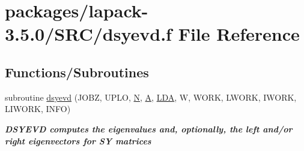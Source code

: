 \hypertarget{dsyevd_8f}{}\section{packages/lapack-\/3.5.0/\+S\+R\+C/dsyevd.f File Reference}
\label{dsyevd_8f}
\subsection*{Functions/\+Subroutines}
\begin{DoxyCompactItemize}
\item 
subroutine \hyperlink{group__doubleSYeigen_ga77dfa610458b6c9bd7db52533bfd53a1}{dsyevd} (J\+O\+B\+Z, U\+P\+L\+O, \hyperlink{polmisc_8c_a0240ac851181b84ac374872dc5434ee4}{N}, \hyperlink{classA}{A}, \hyperlink{example__user_8c_ae946da542ce0db94dced19b2ecefd1aa}{L\+D\+A}, W, W\+O\+R\+K, L\+W\+O\+R\+K, I\+W\+O\+R\+K, L\+I\+W\+O\+R\+K, I\+N\+F\+O)
\begin{DoxyCompactList}\small\item\em {\bfseries  D\+S\+Y\+E\+V\+D computes the eigenvalues and, optionally, the left and/or right eigenvectors for S\+Y matrices} \end{DoxyCompactList}\end{DoxyCompactItemize}
